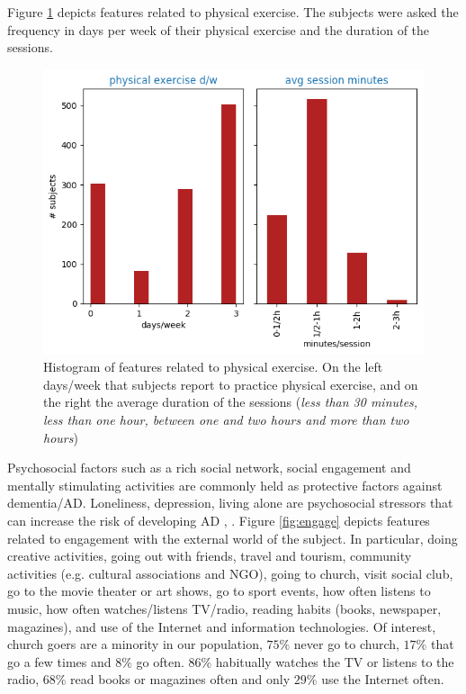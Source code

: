 \documentclass[11pt]{article}
\theoremstyle{definition}
\theoremstyle{remark}
\begin{document}
Figure \ref{fig:phys} depicts features related to physical exercise. The subjects were asked the frequency in days per week of their physical exercise and the duration of the sessions.
\begin{figure}[H]
        \centering
        \includegraphics[keepaspectratio, width=0.6\linewidth]{figures/Fig_phys}
        \caption{Histogram of features related to physical exercise. On the left days/week that subjects report to practice physical exercise, and on the right the average duration of the sessions (\emph{less than 30 minutes, less than one hour, between one and two hours and more than two hours})} 
        \label{fig:phys}
\end{figure}


Psychosocial factors such as a rich social network, social engagement and mentally stimulating activities are commonly held as protective factors against dementia/AD. Loneliness, depression, living alone are psychosocial stressors that can increase the risk of developing AD \cite{johansson2013common}, \cite{sindi2015advances}. Figure \ref{fig:engage} depicts features related to engagement with the external world of the subject. In particular, doing creative activities, going out with friends, travel and tourism, community activities (e.g. cultural associations and NGO), going to church, visit social club, go to the movie theater or art shows, go to sport events, how often listens to music, how often watches/listens TV/radio, reading habits (books, newspaper, magazines), and use of the Internet and information technologies.
Of interest, church goers are a minority in our population, $75\%$ never go to church, $17\%$ that go a few times and $8\%$ go often. $86\%$ habitually watches the TV or listens to the radio, $68\%$ read books or magazines often and only $29\%$ use the Internet often.
\end{document}
